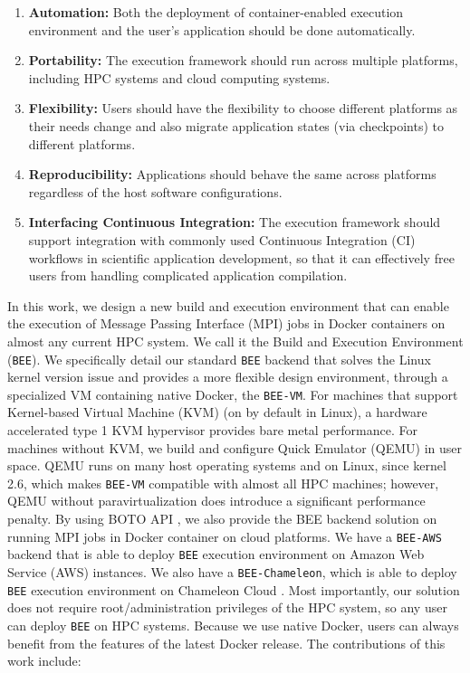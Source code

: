 \begin{enumerate}
\item \textbf{Automation:}
Both the deployment of container-enabled execution environment and the user's application should be done automatically. 
\item \textbf{Portability:}
The execution framework should run across multiple platforms, including HPC systems and cloud computing systems.
\item \textbf{Flexibility:}
Users should have the flexibility to choose different platforms as their needs change and also migrate application states (via checkpoints) to different platforms. 
\item \textbf{Reproducibility:}
Applications should behave the same across platforms regardless of the host software configurations.
\item \textbf{Interfacing Continuous Integration:}
The execution framework should support integration with commonly used Continuous Integration (CI) workflows in scientific application development, so that it can effectively free users from handling complicated application compilation.  
\end{enumerate}

In this work, we design a new build and execution environment that can enable the execution of Message Passing Interface (MPI) jobs in Docker containers on almost any current HPC system. We call it the Build and Execution Environment (\texttt{BEE}). We specifically detail our standard \texttt{BEE} backend that solves the Linux kernel version issue and provides a more flexible design environment, through a specialized VM containing native Docker, the \texttt{BEE-VM}.  For machines that support Kernel-based Virtual Machine (KVM) (on by default in Linux), a hardware accelerated type 1 KVM hypervisor provides bare metal performance.  For machines without KVM, we build and configure Quick Emulator (QEMU) in user space. QEMU runs on many host operating systems and on Linux, since kernel 2.6, which makes \texttt{BEE-VM} compatible with almost all HPC machines; however, QEMU without paravirtualization does introduce a significant performance penalty. By using BOTO API \cite{BOTOAPI}, we also provide the BEE backend solution on running MPI jobs in Docker container on cloud platforms. We have a \texttt{BEE-AWS} backend that is able to deploy \texttt{BEE} execution environment on Amazon Web Service (AWS) instances. We also have a \texttt{BEE-Chameleon}, which is able to deploy \texttt{BEE} execution environment on Chameleon Cloud \cite{chameleon}. Most importantly, our solution does not require root/administration privileges of the HPC system, so any user can deploy \texttt{BEE} on HPC systems. Because we use native Docker, users can always benefit from the features of the latest Docker release. The contributions of this work include:

